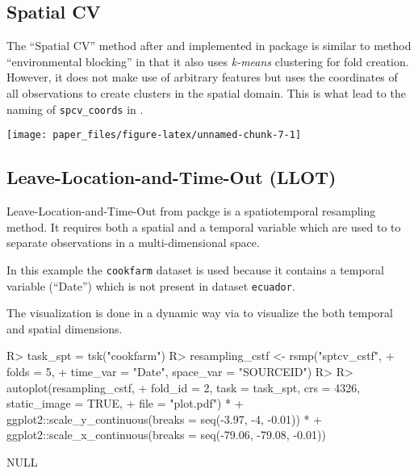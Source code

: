 \documentclass[
]{jss}
\begin{document}
\hypertarget{spatial-cv}{%
\subsection{Spatial CV}\label{spatial-cv}}

The ``Spatial CV'' method after \citep{sperrorest} and implemented in
package  is similar to method ``environmental blocking''
in that it also uses \emph{k-means} clustering for fold creation.
However, it does not make use of arbitrary features but uses the
coordinates of all observations to create clusters in the spatial
domain. This is what lead to the naming of \texttt{spcv\_coords} in
.

\begin{CodeChunk}


\begin{center}\texttt{[image: paper\_files/figure-latex/unnamed-chunk-7-1]} \end{center}

\end{CodeChunk}

\hypertarget{leave-location-and-time-out-llot}{%
\subsection{Leave-Location-and-Time-Out
(LLOT)}\label{leave-location-and-time-out-llot}}

Leave-Location-and-Time-Out from packge  is a spatiotemporal
resampling method. It requires both a spatial and a temporal variable
which are used to to separate observations in a multi-dimensional space.

In this example the \texttt{cookfarm} dataset is used because it
contains a temporal variable (``Date'') which is not present in dataset
\texttt{ecuador}.

The visualization is done in a dynamic way via  to visualize
the both temporal and spatial dimensions.

\begin{CodeChunk}
\begin{CodeInput}
R> task_spt = tsk("cookfarm")
R> resampling_cstf <- rsmp("sptcv_cstf",
+   folds = 5,
+   time_var = "Date", space_var = "SOURCEID")
R> 
R> autoplot(resampling_cstf,
+   fold_id = 2, task = task_spt, crs = 4326, static_image = TRUE,
+   file = "plot.pdf") *
+   ggplot2::scale_y_continuous(breaks = seq(-3.97, -4, -0.01)) *
+   ggplot2::scale_x_continuous(breaks = seq(-79.06, -79.08, -0.01))
\end{CodeInput}
\begin{CodeOutput}
NULL
\end{CodeOutput}
\end{CodeChunk}
\end{document}
